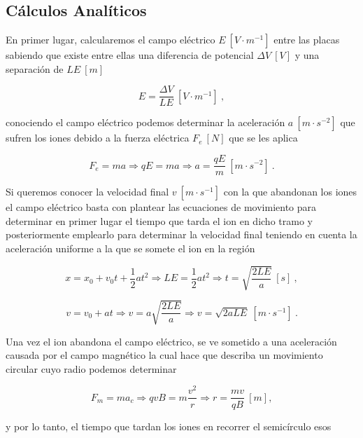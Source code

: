 \documentclass[journal]{IEEEtran}
\begin{document}
\subsection{Cálculos Analíticos}

En primer lugar, calcularemos el campo eléctrico $E~[V\cdot m^{-1}]$ entre las placas sabiendo que existe entre ellas una diferencia de potencial $\Delta V~[V]$ y una separación de $LE~[m]$

\begin{equation}
E = \displaystyle\frac{\Delta V}{LE}~[V\cdot m^{-1}]~,
\end{equation}

conociendo el campo eléctrico podemos determinar la aceleración $a~[m\cdot s^{-2}]$ que sufren los iones debido a la fuerza eléctrica $F_e~[N]$ que se les aplica

\begin{equation}
F_e = ma \Rightarrow qE = ma \Rightarrow a = \displaystyle\frac{qE}{m}~[m\cdot s^{-2}]~.
\end{equation}

Si queremos conocer la velocidad final $v~[m\cdot s^{-1}]$ con la que abandonan los iones el campo eléctrico basta con plantear las ecuaciones de movimiento para determinar en primer lugar el tiempo que tarda el ion en dicho tramo y posteriormente emplearlo para determinar la velocidad final teniendo en cuenta la aceleración uniforme a la que se somete el ion en la región

\begin{equation}
x = x_0 + v_0t + \displaystyle\frac{1}{2}at^2 \Rightarrow LE = \displaystyle\frac{1}{2}at^2 \Rightarrow t = \sqrt{\displaystyle\frac{2LE}{a}}~[s]~,
\end{equation}

\begin{equation}
v = v_0 + at \Rightarrow v = a\sqrt{\displaystyle\frac{2LE}{a}} \Rightarrow v = \sqrt{2aLE}~[m\cdot s^{-1}]~.
\end{equation}

Una vez el ion abandona el campo eléctrico, se ve sometido a una aceleración causada por el campo magnético la cual hace que describa un movimiento circular cuyo radio podemos determinar

\begin{equation}
F_m = ma_c \Rightarrow qvB = m \displaystyle\frac{v^2}{r} \Rightarrow r = \displaystyle\frac{mv}{qB}~[m],
\end{equation}

y por lo tanto, el tiempo que tardan los iones en recorrer el semicírculo esos
\end{document}
